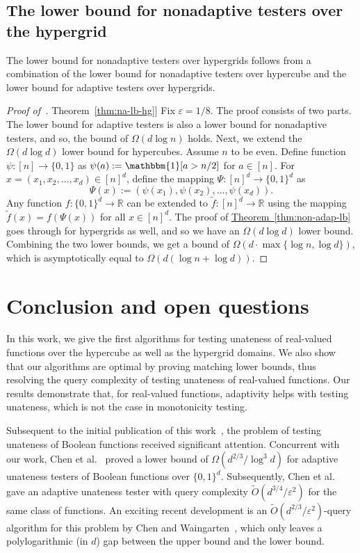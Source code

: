 \documentclass[11pt]{article}
\numberwithin{equation}{section}
\theoremstyle{definition}
\theoremstyle{plain}
\newcommand{\R}{\mathbb R}
\newcommand{\expref}[2]{\hyperref[#2]{#1~\ref{#2}}}
\newcommand{\eps}{\varepsilon}
\newcommand{\Thm}[1]{\expref{Theorem}{thm:#1}}
\begin{document}
\subsection{The lower bound for nonadaptive testers over the hypergrid}\label{sec:na-lb-hg}
The lower bound for nonadaptive testers over hypergrids follows from a combination of the lower bound for nonadaptive testers over hypercube and the lower bound for adaptive testers over hypergrids.

\begin{proof}[Proof of~\Thm{na-lb-hg}]
Fix $\eps = 1/8$. The proof consists of two parts. The lower bound for adaptive testers is also a lower bound for nonadaptive 
testers, %
and so, the bound of $\Omega(d \log n)$ holds.
Next, we extend the $\Omega(d \log d)$ lower bound for hypercubes.
Assume $n$ to be even. Define function $\psi:[n] \to \{0,1\}$ as $\psi(a):= \mathbbm{1}[a > n/2]$ for $a \in [n]$. For $x = (x_1, x_2, \ldots, x_d) \in [n]^d$, define the mapping $\Psi: [n]^d \to \{0,1\}^d$ as
\[\Psi(x) := (\psi(x_1), \psi(x_2), \ldots, \psi(x_d)).\]
Any function $f:\{0,1\}^d \to \R$ can be extended to $\tilde{f}:[n]^d \to \R$ using the mapping $\tilde{f}(x) = f(\Psi(x))$ for all $x \in [n]^d$. The proof of \Thm{non-adap-lb} goes through for hypergrids as well, and so we have an $\Omega(d \log d)$ lower bound. Combining the two lower bounds, we get a bound of $\Omega(d \cdot \max\{\log n, \log d\})$, which is asymptotically equal to $\Omega(d(\log n + \log d))$.
\end{proof}

\section{Conclusion and open questions}
In this work, we give the first algorithms for
testing unateness of real-valued functions over the hypercube as well as the hypergrid domains.
We also show that our algorithms are optimal by proving matching lower bounds, thus resolving the query complexity of testing unateness of real-valued functions.
Our results demonstrate that, for real-valued functions, adaptivity helps with testing unateness, which is not the case in monotonicity testing.

%

Subsequent to the initial publication of this work~\cite{BCPRS17a}, the problem of testing unateness of Boolean functions received significant attention.
Concurrent with our work, Chen et al.~\cite{CWX17} proved a lower bound of $\Omega\left({d^{2/3}}/{\log^3 d} \right)$ for adaptive unateness testers of Boolean functions over $\{0,1\}^d$.
Subsequently, Chen et al.~\cite{CWX17focs} gave an adaptive unateness tester with query complexity $\widetilde{O}\left({d^{3/4}}/{\eps^2}\right)$ for the same class of functions.
An exciting recent development is an $\widetilde{O}\left({d^{2/3}}/{\eps^2}\right)$-query algorithm for this problem by Chen and Waingarten~\cite{CW19}, which only leaves a polylogarithmic (in $d$) gap between the upper bound and the lower bound.
%
\end{document}

